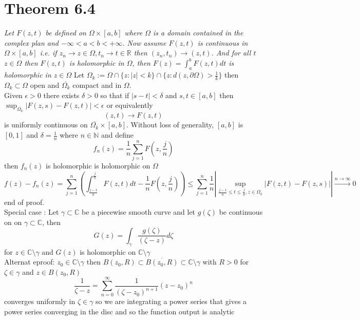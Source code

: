 \documentclass[11pt]{article}
\begin{document}
\section{Theorem 6.4}
\emph{
    Let $F(z,t)$ be defined on  $\Omega \times [a,b]$ where  $\Omega$ is a domain contained in the complex plan and  $-\infty < a < b < +\infty$. Now assume
    $F(z,t)$ is continuous in  $\Omega \times [a,b]$  i.e. if  $z_n \rightarrow z \in \Omega, t_n \rightarrow t \in \mathbb{R}$ then $(z_n,t_n) \rightarrow (z,t)$.
    And for all $t$  $z \in \Omega$ then $F(z,t)$ is holomorphic in  $\Omega$, then  $F(z) = \int_{a}^{b}F(z,t)dt$ is holomorphic in $z \in \Omega$
}
Let $\Omega_k := \Omega \cap \{z : |z| < k\} \cap \{z : d(z, \partial \Omega) > \frac{1}{k}\}$ then $\Omega_k \subset \Omega$ open and $\overline{\Omega_k}$ compact and in  $\Omega$.\\
Given $\epsilon > 0$ there exists $\delta > 0$ so that if $|s-t| < \delta$ and $s,t \in [a,b]$ then  $\sup_{\overline{\Omega_k}} \left| F(z,s) - F(z,t)\right| < \epsilon$ or equivalently
\[
    (z,t) \rightarrow F(z,t)
\] 
is uniformly continuous on $\overline{\Omega_k} \times [a,b]$. Without loss of generality, $[a,b]$ is  $[0,1]$ and  $\delta = \frac{1}{n}$ where $n \in \mathbb{N}$ and define
\[
f_n(z) = \frac{1}{n}\sum_{j=1}^{n}F(z,\frac{j}{n})
\] 
then $f_n(z)$ is holomorphic is holomorphic on  $\Omega$
 \[
     f(z) - f_n(z) = \sum_{j=1}^{n}  \left(\int_{\frac{j-1}{n}}^{\frac{j}{n}}F(z,t) dt - \frac{1}{n}F(z,\frac{j}{n})\right) \le \sum_{j=1}^{n} \frac{1}{n}\left| \sup_{\frac{j-1}{n} \le t \le \frac{j}{n}, z \in \Omega_k}  \left|F(z,t) - F(z,s)\right| \right| \xrightarrow{n\to \infty} 0
\] 
end of proof.\\
Special case : Let $\gamma \subset \mathbb{C}$ be a piecewise smooth curve and let  $g(\zeta)$ be continuous  on  on $\gamma \subset \mathbb{C}$, then 
\[
G(z) = \int_{\gamma}^{}\frac{g(\zeta)}{(\zeta - z)} d \zeta
\] 
for $z \in \mathbb{C} \setminus \gamma$ and $G(z)$ is holomorphic on  $ \mathbb{C} \setminus \gamma$\\
Alternat eproof: $z_0 \in \mathbb{C} \setminus \gamma$ then $B(z_0, R) \subset \overline{ B(z_0, R)} \subset \mathbb{C} \setminus \gamma$ with $ R > 0$ for $\zeta \in \gamma$ and $z \in B(z_0, R)$
\[
\frac{1}{\zeta - z} = \sum_{n=0}^{\infty}\frac{1}{(\zeta - z_0)^{n+1}}(z-z_0)^{n}
\] 
converges uniformly in $\zeta \in \gamma$ so we are integrating a power series that gives a power series converging in the disc and so the function output is analytic
\end{document}

